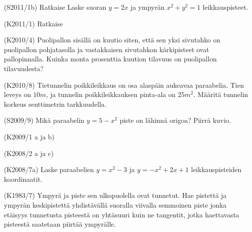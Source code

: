 \begin{tehtava} (S2011/1b) Ratkaise
Laske suoran $y=2x$ ja ympyrän $x^2+y^2=1$ leikkauspisteet.
\end{tehtava}

\begin{tehtava} (K2011/1) Ratkaise
\end{tehtava}

\begin{tehtava}(K2010/4)
Puolipallon sisällä on kuutio siten, että sen yksi sivutahko on puolipallon pohjatasolla ja vastakkaisen sivutahkon kärkipisteet ovat pallopinnalla. Kuinka monta prosenttia kuution tilavuus on puolipallon tilavuudesta?
\end{tehtava}

\begin{tehtava}(K2010/8)
Tietunnelin poikkileikkaus on osa alaspäin aukeavaa paraabelia. Tien leveys on $10 m$, ja tunnelin poikkileikkauksen pinta-ala on $25 m^2$. Määritä tunnelin korkeus senttimetrin tarkkuudella.
\end{tehtava}


\begin{tehtava}(S2009/9)
Mikä paraabelin $y=5-x^2$ piste on lähinnä origoa? Piirrä kuvio.
\end{tehtava}

\begin{tehtava}(K2009/1 a ja b)
\end{tehtava}

\begin{tehtava} (K2008/2 a ja c)
\end{tehtava}


\begin{tehtava}(K2008/7a)
Laske paraabelien $y=x^2-3$ ja $y=-x^2+2x+1$ leikkauspisteiden koordinaatit.
\end{tehtava}

\begin{tehtava}(K1983/7)
Ympyrä ja piste sen ulkopuolella ovat tunnetut. Hae pistettä ja ympyrän keskipistettä yhdistävällä suoralla viivalla semmoinen piste jonka etäisyys tunnetusta pisteestä on yhtäsuuri kuin ne tangentit, jotka haettavasta pisteestä saatetaan piirtää ympyrälle. 
\end{tehtava}


